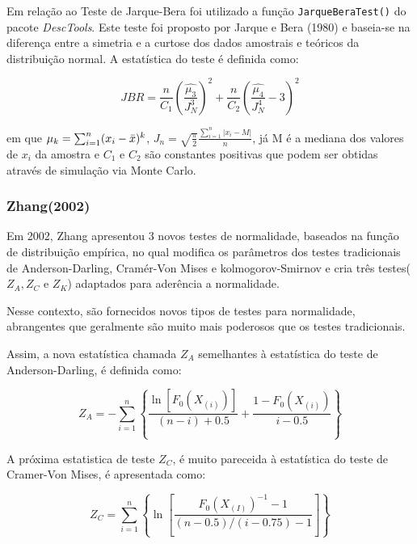 \documentclass[a4paper,11pt]{article} %
\begin{document}
Em relação ao Teste de Jarque-Bera foi utilizado a função  \texttt{JarqueBeraTest()} do pacote \textit{DescTools}. Este teste foi proposto por Jarque e Bera (1980) e baseia-se na diferença entre a simetria e a curtose dos dados amostrais e teóricos da distribuição normal. A estatística do teste é definida como: 

\begin{equation}
    JBR = \frac{n}{C_{1}} \left( \frac{\hat{\mu_{3}}}{J^{3}_{N}}  \right)^{2} + \frac{n}{C_{2}} \left( \frac{ \hat{\mu_{4}}}{J^{4}_{N}} - 3 \right)^{2} 
\end{equation}


em que $\mu_{k} = \sum_{i=1}^{n} (x_{i}- \Bar{x})^{k}$, $J_{n} = \sqrt{\frac{\pi}{2}}\frac{\sum_{i=1}^{n}|x_{i}-M|}{n}$, já M é a mediana dos valores de $x_{i}$ da amostra e $C_{1}$ e $C_{2}$ são constantes positivas que podem ser obtidas através de simulação via Monte Carlo. \vskip0.3cm

\subsubsection{Zhang(2002)}

Em 2002, Zhang apresentou 3 novos testes de normalidade, baseados na função de distribuição empírica, no qual modifica os parâmetros dos testes tradicionais de Anderson-Darling, Cramér-Von Mises e kolmogorov-Smirnov e cria três testes($Z_{A}, Z_{C}$ e $Z_{K}$) adaptados para aderência a normalidade.\vskip0.3cm

Nesse contexto, são fornecidos novos tipos de testes para normalidade, abrangentes que geralmente são muito mais poderosos que os testes tradicionais. \vskip0.3cm

Assim, a nova estatística chamada $Z_{A}$ semelhantes à estatística do teste de Anderson-Darling, é definida como:

\begin{equation}
    Z_{A} = - \sum_{i=1}^{n} \left\{  \frac{ \ln[F_{0}(X_{(i)})]}{(n-i)+0.5} + \frac{1-F_{0}(X_{(i)})}{i-0.5}  \right\}  
\end{equation}

A próxima estatistica de teste $Z_{C}$, é muito pareceida à estatística do teste de Cramer-Von Mises, é apresentada como:

\begin{equation}
    Z_{C} = \sum_{i=1}^{n}  \left\{ \ln\left[ \frac{F_{0}(X_{(I)})^{-1}-1}{(n-0.5)/(i-0.75)-1} \right] \right\}
\end{equation}
\end{document}
